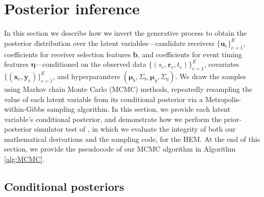 \documentclass[ba]{imsart}
\numberwithin{equation}{section}
\theoremstyle{plain}
\begin{document}
	\section{Posterior inference}\label{sec:inference}
	In this section we describe how we invert the generative process to obtain the posterior distribution over the latent variables---candidate receivers $\{\boldsymbol{u}_e\}_{e=1}^E$, coefficients for receiver selection features $\boldsymbol{b}$, and coefficients for event timing features $\boldsymbol{\eta}$---conditioned on the observed data $\{(s_e, \boldsymbol{r}_e, t_e)\}_{e=1}^E$, covariates $\{(\boldsymbol{x}_e, \boldsymbol{y}_e)\}_{e=1}^E$, and hyperparamters $(\boldsymbol{\mu}_b, \Sigma_b, \boldsymbol{\mu}_\eta, \Sigma_\eta)$. We draw the samples using Markov chain Monte Carlo (MCMC) methods, repeatedly resampling the value of each latent variable from its conditional posterior via a Metropolis-within-Gibbs sampling algorithm. In this section, we provide each latent variable's conditional posterior, and demonstrate how we perform the prior-posterior simulator test of \cite{geweke2004getting}, in which we evaluate the integrity of both our mathematical derivations and the sampling code, for the HEM. At the end of this section, we provide the pseudocode of our MCMC algorithm in Algorithm \ref{alg:MCMC}.
	
	\subsection{Conditional posteriors}\label{subsec:conditionaldist}
\end{document}
